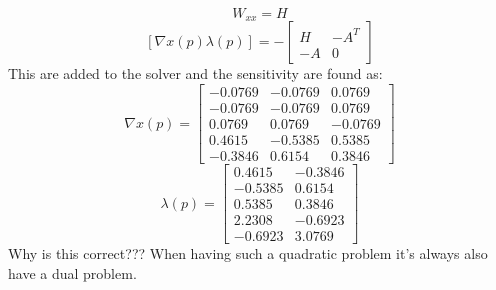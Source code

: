 \[W_{xx}=H\]
\[[\nabla x(p) \lambda(p)]= - \begin{bmatrix}H & -A^T \\-A & 0\end{bmatrix}\]
This are added to the solver and the sensitivity are found as:
\[\nabla x(p)=\begin{bmatrix}
 	-0.0769 &  -0.0769 &  0.0769 \\
   	-0.0769 &  -0.0769 &  0.0769 \\
     0.0769 &   0.0769 & -0.0769 \\
     0.4615 &  -0.5385 &  0.5385 \\
   	-0.3846 &   0.6154 &  0.3846	
\end{bmatrix}\]
\[\lambda(p)=\begin{bmatrix}
	0.4615  & -0.3846 \\
   -0.5385  &  0.6154 \\
    0.5385  &  0.3846 \\
    2.2308  & -0.6923 \\
   -0.6923  &  3.0769 
\end{bmatrix}\]
Why is this correct??? 
When having such a quadratic problem it's always also have a dual problem.   
